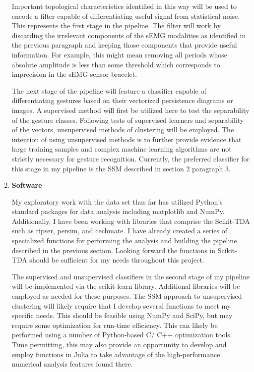 \documentclass[11pt]{article}
\begin{document}
\begin{enumerate}
Important topological characteristics identified in this way will be used to encode a filter capable of differentiating useful signal from statistical noise. This represents the first stage in the pipeline. The filter will work by discarding the irrelevant components of the sEMG modalities as identified in the previous paragraph and keeping those components that provide useful information. For example, this might mean removing all periods whose absolute amplitude is less than some threshold which corresponds to imprecision in the sEMG sensor bracelet.

The next stage of the pipeline will feature a classifier capable of differentiating gestures based on their vectorized persistence diagrams or images. A supervised method will first be utilized here to test the separability of the gesture classes. Following tests of supervised learners and separability of the vectors, unsupervised methods of clustering will be employed. The intention of using unsupervised methods is to further provide evidence that large training samples and complex machine learning algorithms are not strictly necessary for gesture recognition. Currently, the preferred classifier for this stage in my pipeline is the SSM described in section 2 paragraph 3.

\newpage

\item \textbf{Software}

My exploratory work with the data set thus far has utilized Python's standard packages for data analysis including matplotlib and NumPy. Additionally, I have been working with libraries that comprise the Scikit-TDA such as ripser, persim, and cechmate. I have already created a series of specialized functions for performing the analysis and building the pipeline described in the previous section. Looking forward the functions in Scikit-TDA should be sufficient for my needs throughout this project.

The supervised and unsupervised classifiers in the second stage of my pipeline will be implemented via the scikit-learn library. Additional libraries will be employed as needed for these purposes. The SSM approach \cite{ssm1}\cite{ssm2} to unsupervised clustering will likely require that I develop several functions to meet my specific needs. This should be feasible using NumPy and SciPy, but may require some optimization for run-time efficiency. This can likely be performed using a number of Python-based C/ C++ optimization tools. Time permitting, this may also provide an opportunity to develop and employ functions in Julia to take advantage of the high-performance numerical analysis features found there.


\end{enumerate}
\end{document}
